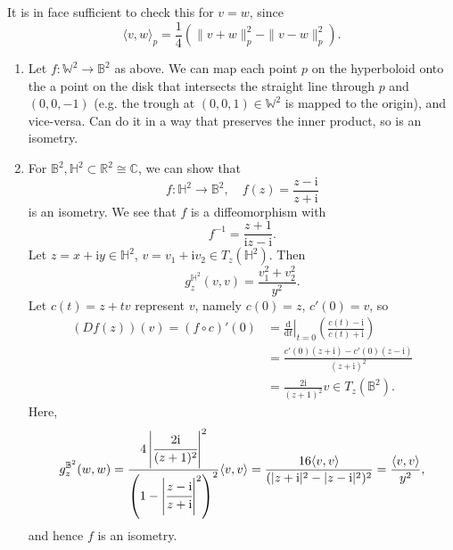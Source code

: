 \documentclass[letter-paper]{tufte-book}
\newenvironment{example}[1][Example]{\begin{trivlist}
\item[\hskip \labelsep {\bfseries #1}]}{\end{trivlist}}
\newenvironment{remark}[1][Remark]{\begin{trivlist}
\item[\hskip \labelsep {\bfseries #1}]}{\end{trivlist}}
\begin{document}
\begin{remark}
  It is in face sufficient to check this for $v=w$, since
  \begin{equation*}
    \langle v,w\rangle_p = \frac{1}{4}\left(\|v+w\|^2_p - \|v-w\|^2_p\right).
  \end{equation*}
\end{remark}

\begin{example}
  \begin{enumerate}
    \item Let $f: \mathbb{W}^2 \to \mathbb{B}^2$ as above. We can map each point $p$ on the hyperboloid onto the a point on the disk that intersects the straight line through $p$ and $(0,0,-1)$ (e.g. the trough at $(0,0,1) \in \mathbb{W}^2$ is mapped to the origin), and vice-versa. Can do it in a way that preserves the inner product, so is an isometry.
    
    \item For $\mathbb{B}^2, \mathbb{H}^2 \subset \mathbb{R}^2 \cong \mathbb{C}$, we can show that
    \begin{equation*}
      f: \mathbb{H}^2 \to \mathbb{B}^2, \quad f(z) = \frac{z-\mathrm{i}}{z+\mathrm{i}}
    \end{equation*}
    is an isometry. We see that $f$ is a diffeomorphism with
    \begin{equation*}
      f^{-1} = \frac{z+1}{\mathrm{i}z - \mathrm{i}}.
    \end{equation*}
    Let $z=x+\mathrm{i}y \in \mathbb{H}^2$, $v = v_1 + \mathrm{i}v_2 \in T_z(\mathbb{H}^2)$. Then
    \begin{equation*}
      g_z^{\mathbb{H}^2}(v, v) = \frac{v_1^2 + v_2^2}{y^2}.
    \end{equation*}
    Let $c(t) = z + tv$ represent $v$, namely $c(0) = z$, $c'(0) = v$, so
    \begin{align*}
      (Df(z))(v) = (f\circ c)'(0)
        &= \left.\frac{\mathrm{d}}{\mathrm{d}t}\right|_{t=0} \left(\frac{c(t) - \mathrm{i}}{c(t) + \mathrm{i}}\right)\\
        &= \frac{c'(0)(z+\mathrm{i}) - c'(0)(z-\mathrm{i})}{(z+\mathrm{i})^2}\\
        &= \frac{2\mathrm{i}}{(z+1)^2}v \in T_z(\mathbb{B}^2).
    \end{align*}
    Here,
    \begin{equation*}
      g_z^{\mathbb{B}^2}(w, w)
        = \frac{4\left|\cfrac{2\mathrm{i}}{(z+1)^2}\right|^2}{\left(1-\left|\cfrac{z-\mathrm{i}}{z+\mathrm{i}}\right|^2\right)^2}\langle v,v\rangle 
        = \frac{16\langle v,v\rangle}{(|z+\mathrm{i}|^2 - |z-\mathrm{i}|^2)^2} = \frac{\langle v,v\rangle}{y^2},
    \end{equation*}
    and hence $f$ is an isometry.
  \end{enumerate}
\end{example}
\end{document}
